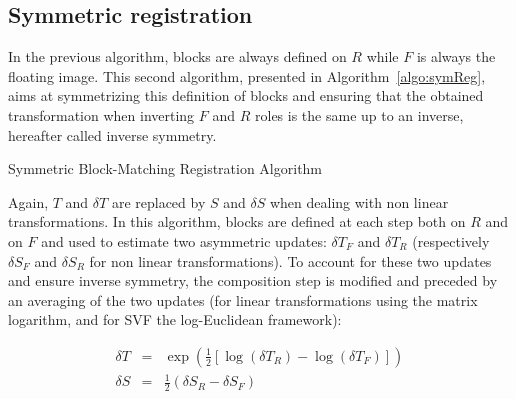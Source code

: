 \documentclass[a4paper]{article}
\begin{document}

\subsection{Symmetric registration} %
\label{sub:symmetric_registration}

In the previous algorithm, blocks are always defined on $R$ while $F$ is always the floating image. This second algorithm, presented in Algorithm~\ref{algo:symReg}, aims at symmetrizing this definition of blocks and ensuring that the obtained transformation when inverting $F$ and $R$ roles is the same up to an inverse, hereafter called inverse symmetry.

\begin{algorithm}[!htbp]
\caption{Symmetric Block-Matching Registration Algorithm}
\label{algo:symReg}
\begin{algorithmic}[1]
    \ENDFOR
  \ENDFOR
\end{algorithmic}
\end{algorithm}
Again, $T$ and $\delta T$ are replaced by $S$ and $\delta S$ when dealing with non linear transformations. In this algorithm, blocks are defined at each step both on $R$ and on $F$ and used to estimate two asymmetric updates: $\delta T_F$ and $\delta T_R$ (respectively $\delta S_F$ and $\delta S_R$ for non linear transformations). To account for these two updates and ensure inverse symmetry, the composition step is modified and preceded by an averaging of the two updates (for linear transformations using the matrix logarithm, and for SVF the log-Euclidean framework):

\begin{eqnarray}
	\delta T & = & \exp\left(\frac{1}{2} \left[\log(\delta T_R) - \log(\delta T_F)\right] \right) \\
	\delta S & = & \frac{1}{2} \left(\delta S_R - \delta S_F\right)
\end{eqnarray}
\end{document}
